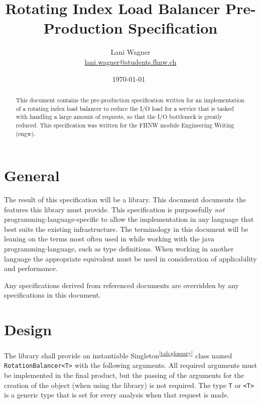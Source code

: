 \documentclass[11pt]{article} %
\title{Rotating Index Load Balancer Pre-Production Specification}
\author{Lani Wagner\\\href{mailto:lani.wagner@students.fhnw.ch}{lani.wagner@students.fhnw.ch}}
\date{\today\ \currenttime} %
\begin{document}
    \VerbatimFootnotes
    \clearpage\maketitle
    \thispagestyle{empty}
    \begin{abstract}
        This document contains the pre-production specification written for an implementation of a rotating index
        load balancer to reduce the I/O load for a service that is tasked with handling a large amount of requests,
        so that the I/O bottleneck is greatly reduced. This specification was written for the FHNW module Engineering
        Writing (engw).
    \end{abstract}
    {\hypersetup{hidelinks} \tableofcontents}
    \newpage


    \section{General}

    The result of this specification will be a library. This document documents the features this library must provide. This specification is purposefully \textit{not} programming-language-specific to allow the implementation in any language that best suits the existing infrastructure. The terminology in this document will be leaning on the terms most often used in while working with the java programming-language, such as type definitions. When working in another language the appropriate equivalent must be used in consideration of applicability and performance.

    Any specifications derived from referenced documents are overridden by any specifications in this document.


    \section{Design}

    The library shall provide an instantiable Singleton\textsuperscript{\ref{tab:glossary}} class named
    \verb|RotationBalancer<T>| with the following arguments. All required arguments must be implemented in the final
    product, but the passing of the arguments for the creation of the object (when using the library) is not required. The type \verb|T| or
    \verb|<T>| is a generic type that is set for every analysis when that request is made.
\end{document}
